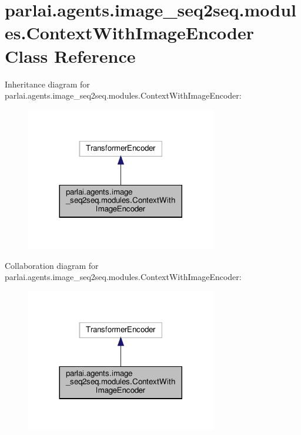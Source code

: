 \hypertarget{classparlai_1_1agents_1_1image__seq2seq_1_1modules_1_1ContextWithImageEncoder}{}\section{parlai.\+agents.\+image\+\_\+seq2seq.\+modules.\+Context\+With\+Image\+Encoder Class Reference}
\label{classparlai_1_1agents_1_1image__seq2seq_1_1modules_1_1ContextWithImageEncoder}


Inheritance diagram for parlai.\+agents.\+image\+\_\+seq2seq.\+modules.\+Context\+With\+Image\+Encoder\+:
\nopagebreak
\begin{figure}[H]
\begin{center}
\leavevmode
\includegraphics[width=236pt]{d6/d77/classparlai_1_1agents_1_1image__seq2seq_1_1modules_1_1ContextWithImageEncoder__inherit__graph}
\end{center}
\end{figure}


Collaboration diagram for parlai.\+agents.\+image\+\_\+seq2seq.\+modules.\+Context\+With\+Image\+Encoder\+:
\nopagebreak
\begin{figure}[H]
\begin{center}
\leavevmode
\includegraphics[width=236pt]{d1/d86/classparlai_1_1agents_1_1image__seq2seq_1_1modules_1_1ContextWithImageEncoder__coll__graph}
\end{center}
\end{figure}
